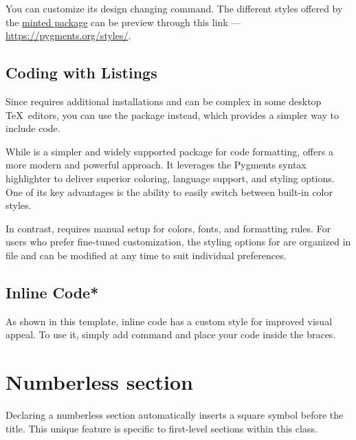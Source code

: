 \documentclass[9pt,a4paper,twocolumn,twoside]{rho-class/rho}
\begin{document}
		You can customize its design changing \inlinecode{\usemintedstyle} command. The different styles offered by the \href{https://ctan.org/pkg/minted}{minted package} can be preview through this link — \url{https://pygments.org/styles/}.

    \subsection{Coding with Listings}
	
		Since  requires additional installations and can be complex in some desktop \TeX\ editors, you can use the  package instead, which provides a simpler way to include code.
		
		\begin{code}
			
			\label{lst:example2}
            \caption{Python code example with listings.}
		\end{code}
		
		While  is a simpler and widely supported package for code formatting,  offers a more modern and powerful approach. It leverages the Pygments syntax highlighter to deliver superior coloring, language support, and styling options. One of its key advantages is the ability to easily switch between built-in color styles.
		
		In contrast,  requires manual setup for colors, fonts, and formatting rules.
		For users who prefer fine-tuned customization, the styling options for  are organized in  file and can be modified at any time to suit individual preferences.

	\subsection{Inline Code*}
	
		As shown in this template, inline code has a custom style for improved visual appeal. To use it, simply add \inlinecode{\inlinecode{}} command and place your code inside the braces.

\section*{Numberless section}

    Declaring a numberless section automatically inserts a square symbol before the title. This unique feature is specific to first-level sections within this class.
    
\end{document}
